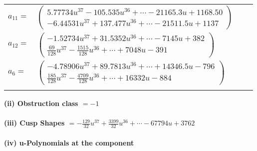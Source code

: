 \documentclass[1p]{elsarticle_modified}
\theoremstyle{definition}
\begin{document}
\begin{tabular}{m{7pt} m{180pt} m{7pt} m{180pt} }
\flushright $a_{11}=$&$\begin{pmatrix}5.77734 u^{37}-105.535 u^{36}+\cdots-21165.3 u+1168.50\\-6.44531 u^{37}+137.477 u^{36}+\cdots-21511.5 u+1137\end{pmatrix}$ \\
\flushright $a_{12}=$&$\begin{pmatrix}-1.52734 u^{37}+31.5352 u^{36}+\cdots-7145 u+382\\\frac{69}{128} u^{37}-\frac{1515}{128} u^{36}+\cdots+7048 u-391\end{pmatrix}$ \\
\flushright $a_{6}=$&$\begin{pmatrix}-4.78906 u^{37}+89.7813 u^{36}+\cdots+14346.5 u-796\\\frac{185}{128} u^{37}-\frac{4709}{128} u^{36}+\cdots+16332 u-884\end{pmatrix}$\\&\end{tabular}
\flushleft \textbf{(ii) Obstruction class $= -1$}\\~\\
\flushleft \textbf{(iii) Cusp Shapes $= -\frac{129}{32} u^{37}+\frac{3399}{32} u^{36}+\cdots-67794 u+3762$}\\~\\
\newpage\renewcommand{\arraystretch}{1}
\flushleft \textbf{(iv) u-Polynomials at the component}\newline \\
\end{document}
